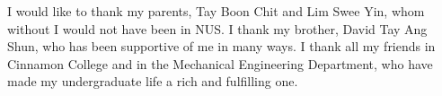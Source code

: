 \begin{acknowledgments}

I would like to thank my parents, Tay Boon Chit and Lim Swee Yin, whom without I would not have been in NUS. I thank my brother, David Tay Ang Shun, who has been supportive of me in many ways. I thank all my friends in Cinnamon College and in the Mechanical Engineering Department, who have made my undergraduate life a rich and fulfilling one.

\end{acknowledgments}
